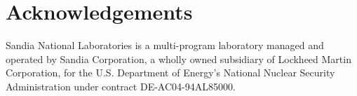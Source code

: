 \section*{Acknowledgements}
Sandia National Laboratories is a multi-program laboratory managed and operated
by Sandia Corporation, a wholly owned subsidiary of Lockheed Martin
Corporation, for the U.S. Department of Energy's National Nuclear Security
Administration under contract DE-AC04-94AL85000.




